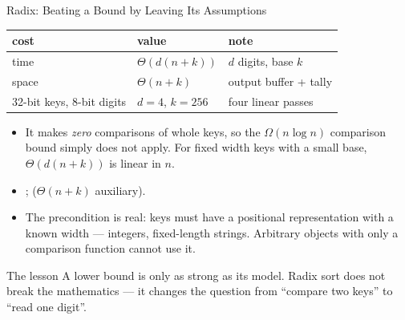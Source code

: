\documentclass[aspectratio=169]{beamer}
\begin{document}
\begin{frame}{Radix: Beating a Bound by Leaving Its Assumptions}
  \begin{center}
  {\footnotesize
  \begin{tabular}{lll}
    \toprule
    \textbf{cost} & \textbf{value} & \textbf{note} \\
    \midrule
    time & $\Theta(d(n+k))$ & $d$ digits, base $k$ \\
    space & $\Theta(n+k)$ & output buffer + tally \\
    32-bit keys, 8-bit digits & $d=4$, $k=256$ & four linear passes \\
    \bottomrule
  \end{tabular}}
  \end{center}
  \begin{itemize}
    \item It makes \emph{zero} comparisons of whole keys, so the
      $\Omega(n\log n)$ comparison bound simply does not apply. For fixed
      width keys with a small base, $\Theta(d(n+k))$ is linear in $n$.
    \item {};  ($\Theta(n+k)$ auxiliary).
    \item The precondition is real: keys must have a positional
      representation with a known width --- integers, fixed-length strings.
      Arbitrary objects with only a comparison function cannot use it.
  \end{itemize}
  \begin{exampleblock}{The lesson}
    A lower bound is only as strong as its model. Radix sort does not break
    the mathematics --- it changes the question from ``compare two keys'' to
    ``read one digit''.
  \end{exampleblock}
\end{frame}
\end{document}
